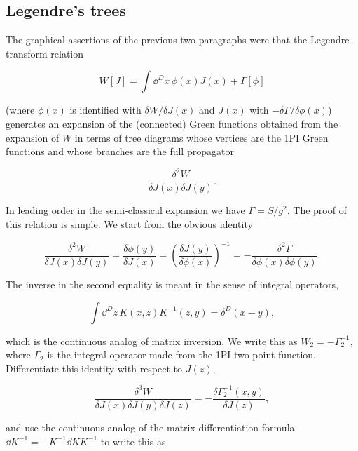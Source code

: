 \subsection{Legendre's trees}

The graphical assertions of the previous two paragraphs were that the Legendre
transform relation

\begin{equation}
W[J]=\int\dd^D x\,\phi(x)J(x)+\Gamma[\phi]
\label{eq:3.35}
\end{equation}

(where $\phi(x)$ is identified with $\delta W/\delta J(x)$ and $J(x)$ with $-\delta\Gamma/\delta\phi(x)$) generates an
expansion of the (connected) Green functions obtained from the expansion of $W$ in
terms of tree diagrams whose vertices are the 1PI Green functions and whose branches
are the full propagator

\[
\frac{\delta^2W}{\delta J(x)\delta J(y)}.
\]

In leading order in the semi-classical expansion we have $\Gamma=S/g^2$.
The proof of this relation is simple. We start from the obvious identity

\[
\frac{\delta^2W}{\delta J(x)\delta J(y)}
=\frac{\delta\phi(y)}{\delta J(x)}
=\left(\frac{\delta J(y)}{\delta\phi(x)}\right)^{-1}
=-\frac{\delta^2\Gamma}{\delta\phi(x)\delta\phi(y)}.
\]

The inverse in the second equality is meant in the sense of integral operators,

\[
\int\dd^D z\,K(x,z)K^{-1}(z,y)=\delta^D(x-y),
\]

which is the continuous analog of matrix inversion. We write this as $W_2=-\Gamma_2^{-1}$, where
$\Gamma_2$ is the integral operator made from the 1PI two-point function.
Differentiate this identity with respect to $J(z)$,

\begin{equation}
\frac{\delta^3W}{\delta J(x)\delta J(y)\delta J(z)}=-\frac{\delta\Gamma_2^{-1}(x,y)}{\delta J(z)},
\label{eq:3.36}
\end{equation}

and use the continuous analog of the matrix differentiation formula $\dd K^{-1}=-K^{-1}\dd K K^{-1}$ to write this as

